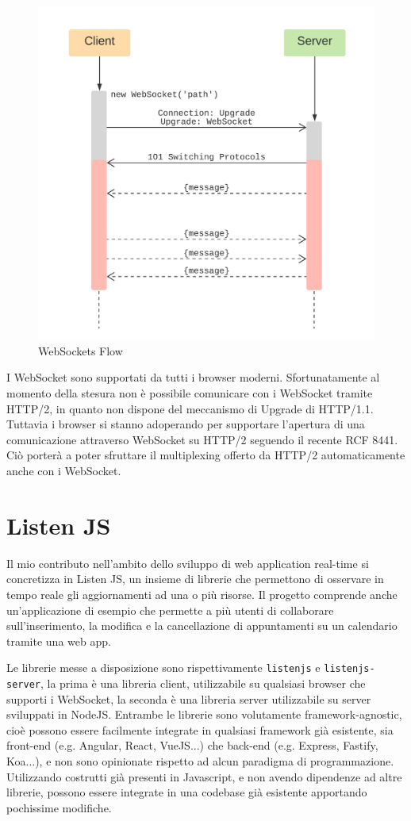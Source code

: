 \documentclass[12pt,a4paper,openright,twoside]{report}
\begin{document}
\begin{figure}[!htbp]
\centering
\includegraphics[width=.5\textwidth]{assets/websockets.png}
\caption{WebSockets Flow}
\label{fig:websockets}
\end{figure}
I WebSocket sono supportati da tutti i browser moderni. 
Sfortunatamente al momento della stesura non è possibile comunicare con i WebSocket tramite HTTP/2, in quanto non dispone del meccanismo di Upgrade di HTTP/1.1. Tuttavia i browser si stanno adoperando per supportare l'apertura di una comunicazione attraverso WebSocket su HTTP/2 seguendo il recente RCF 8441\cite{websockets_http2_rfc}. Ciò porterà a poter sfruttare il multiplexing offerto da HTTP/2 automaticamente anche con i WebSocket.
\chapter{Listen JS}
Il mio contributo nell'ambito dello sviluppo di web application real-time si concretizza in Listen JS, un insieme di librerie che permettono di osservare in tempo reale gli aggiornamenti ad una o più risorse.
Il progetto comprende anche un'applicazione di esempio che permette a più utenti di collaborare sull'inserimento, la modifica e la cancellazione di appuntamenti su un calendario tramite una web app.

\bigskip

Le librerie messe a disposizione sono rispettivamente \lstinline{listenjs} e \lstinline{listenjs-server}, la prima è una libreria client, utilizzabile su qualsiasi browser che supporti i WebSocket, la seconda è una libreria server utilizzabile su server sviluppati in NodeJS.
Entrambe le librerie sono volutamente framework-agnostic, cioè possono essere facilmente integrate in qualsiasi framework già esistente, sia front-end (e.g. Angular, React, VueJS...) che back-end (e.g. Express, Fastify, Koa...), e non sono opinionate rispetto ad alcun paradigma di programmazione. Utilizzando costrutti già presenti in Javascript, e non avendo dipendenze ad altre librerie, possono essere integrate in una codebase già esistente apportando pochissime modifiche.
\end{document}

